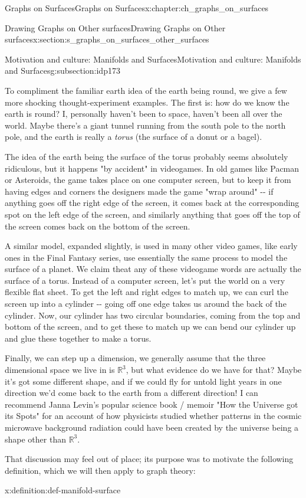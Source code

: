 \documentclass[oneside,10pt,]{book}
\numberwithin{equation}{section}
\newcommand{\reals}{\mathbb{R}}
\begin{document}
\begin{chapterptx}{Graphs on Surfaces}{}{Graphs on Surfaces}{}{}{x:chapter:ch_graphs_on_surfaces}
\begin{sectionptx}{Drawing Graphs on Other surfaces}{}{Drawing Graphs on Other surfaces}{}{}{x:section:s_graphs_on_surfaces_other_surfaces}
\begin{subsectionptx}{Motivation and culture: Manifolds and Surfaces}{}{Motivation and culture: Manifolds and Surfaces}{}{}{g:subsection:idp173}
\par
To compliment the familiar earth idea of the earth being round, we give a few more shocking thought-experiment examples.  The first is: how do we know the earth is round?  I, personally haven't been to space, haven't been all over the world.  Maybe there's a giant tunnel running from the south pole to the north pole, and the earth is really a \emph{torus} (the surface of a donut or a bagel).%
\par
The idea of the earth being the surface of the torus probably seems absolutely ridiculous, but it happens "by accident" in videogames.  In old games like Pacman or Asteroids, the game takes place on one computer screen, but to keep it from having edges and corners the designers made the game "wrap around" -{}-{} if anything goes off the right edge of the screen, it comes back at the corresponding spot on the left edge of the screen, and similarly anything that goes off the top of the screen comes back on the bottom of the screen.%
\par
A similar model, expanded slightly, is used in many other video games, like early ones in the Final Fantasy series, use essentially the same process to model the surface of a planet.  We claim theat any of these videogame words are actually the surface of a torus.  Instead of a computer screen, let's put the world on a very flexible flat sheet.  To get the left and right edges to match up, we can curl the screen up into a cylinder -{}-{} going off one edge takes us around the back of the cylinder.  Now, our cylinder has two circular boundaries, coming from the top and bottom of the screen, and to get these to match up we can bend our cylinder up and glue these together to make a torus.%
\par
Finally, we can step up a dimension, we generally assume that the three dimensional space we live in is \(\reals^3\), but what evidence do we have for that?  Maybe it's got some different shape, and if we could fly for untold light years in one direction we'd come back to the earth from a different direction!  I can recommend Janna Levin's popular science book \slash{} memoir "How the Universe got its Spots" for an account of how physicists studied whether patterns in the cosmic microwave background radiation could have been created by the universe being a shape other than \(\reals^3\).%
\par
That discussion may feel out of place; its purpose was to motivate the following definition, which we will then apply to graph theory:%
\begin{definition}{}{x:definition:def-manifold-surface}%

\end{definition}
\end{subsectionptx}
\end{sectionptx}
\end{chapterptx}
\end{document}
